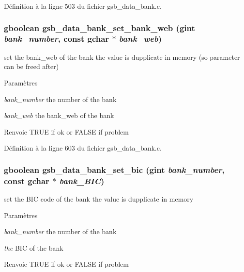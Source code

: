 Définition à la ligne 503 du fichier gsb\_\-data\_\-bank.c.

\subsubsection[{gsb\_\-data\_\-bank\_\-set\_\-bank\_\-web}]{\setlength{\rightskip}{0pt plus 5cm}gboolean gsb\_\-data\_\-bank\_\-set\_\-bank\_\-web (gint {\em bank\_\-number}, \/  const gchar $\ast$ {\em bank\_\-web})}\label{gsb__data__bank_8h_ab601e5c8cd28a7956089b06c7198f435}
set the bank\_\-web of the bank the value is dupplicate in memory (so parameter can be freed after)


\begin{DoxyParams}{Paramètres}
\item[{\em bank\_\-number}]the number of the bank \item[{\em bank\_\-web}]the bank\_\-web of the bank\end{DoxyParams}
\begin{DoxyReturn}{Renvoie}
TRUE if ok or FALSE if problem 
\end{DoxyReturn}


Définition à la ligne 603 du fichier gsb\_\-data\_\-bank.c.

\subsubsection[{gsb\_\-data\_\-bank\_\-set\_\-bic}]{\setlength{\rightskip}{0pt plus 5cm}gboolean gsb\_\-data\_\-bank\_\-set\_\-bic (gint {\em bank\_\-number}, \/  const gchar $\ast$ {\em bank\_\-BIC})}\label{gsb__data__bank_8h_aa021dbe34eec317be81c19956e49519c}
set the BIC code of the bank the value is dupplicate in memory


\begin{DoxyParams}{Paramètres}
\item[{\em bank\_\-number}]the number of the bank \item[{\em the}]BIC of the bank\end{DoxyParams}
\begin{DoxyReturn}{Renvoie}
TRUE if ok or FALSE if problem 
\end{DoxyReturn}


